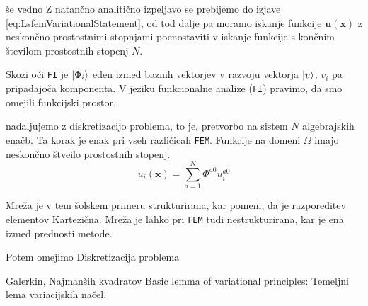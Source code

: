 še vedno  Z natančno analitično izpeljavo se prebijemo do izjave \eqref{eq:LsfemVariationalStatement}, od tod dalje pa moramo iskanje funkcije $\mathbf{u(x)}$ z neskončno prostostnimi stopnjami poenostaviti v iskanje funkcije s končnim številom prostostnih stopenj $N$. 

Skozi oči \texttt{FI} je $\ket{\Phi_i}$ eden izmed baznih vektorjev v razvoju vektorja $\ket{v}$, $v_i$ pa pripadajoča komponenta.
V jeziku funkcionalne analize (\texttt{FI}) pravimo, da smo omejili funkcijski prostor.

nadaljujemo z diskretizacijo problema, to je, pretvorbo na sistem $N$ algebrajskih enačb. Ta korak je enak pri vseh različicah \texttt{FEM}. Funkcije na domeni $\Omega$ imajo neskončno štveilo prostostnih stopenj. 
\begin{equation}
    u_i(\mathbf{x}) = \sum_{a = 1}^N \Phi^{a0} u^{a0}_i
\end{equation}

Mreža je v tem šolskem primeru strukturirana, kar pomeni, da je razporeditev elementov Kartezična. Mreža je lahko pri \texttt{FEM} tudi nestrukturirana, kar je ena izmed prednosti metode.

Potem omejimo Diskretizacija problema 

Galerkin, Najmanših kvadratov \cite{JiangB-LSFEM}
Basic lemma of variational principles: Temeljni lema variacijskih načel.